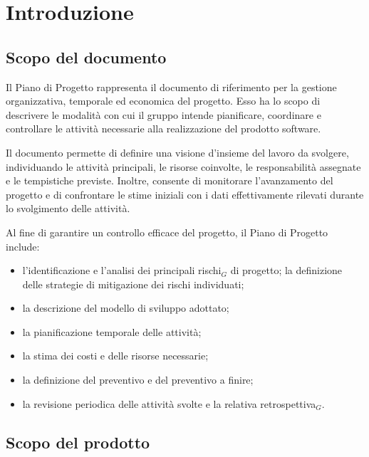 \documentclass[a4paper, 10pt, colorlinks=true, linkcolor=black, urlcolor=blue, citecolor=blue, hidelinks]{article}
\begin{document}
\newpage
{} %
\tableofcontents
\newpage
\newpage



\newpage

\section{Introduzione}

\subsection{Scopo del documento}

Il Piano di Progetto rappresenta il documento di riferimento per la gestione organizzativa, temporale ed economica del progetto. 
Esso ha lo scopo di descrivere le modalità con cui il gruppo intende pianificare, coordinare e controllare le attività necessarie alla realizzazione del prodotto software.

Il documento permette di definire una visione d'insieme del lavoro da svolgere, individuando le attività principali, le risorse coinvolte, le responsabilità assegnate e le tempistiche previste. 
Inoltre, consente di monitorare l'avanzamento del progetto e di confrontare le stime iniziali con i dati effettivamente rilevati durante lo svolgimento delle attività.

Al fine di garantire un controllo efficace del progetto, il Piano di Progetto include:

\begin{itemize}
    \item l'identificazione e l'analisi dei principali rischi$_G$ di progetto; la definizione delle strategie di mitigazione dei rischi individuati;
    \item la descrizione del modello di sviluppo adottato;
    \item la pianificazione temporale delle attività;
    \item la stima dei costi e delle risorse necessarie;
    \item la definizione del preventivo e del preventivo a finire;
    \item la revisione periodica delle attività svolte e la relativa retrospettiva$_G$.
\end{itemize}

\subsection{Scopo del prodotto}
\end{document}
